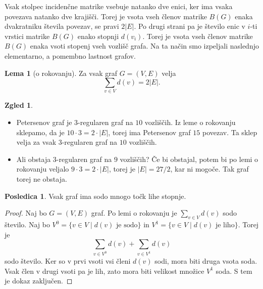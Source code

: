 \documentclass[11pt]{book}
\theoremstyle{definition}
\theoremstyle{zgled}
\newtheorem*{zgled}{Zgled}
\theoremstyle{odprtproblem}
\theoremstyle{domacanaloga}
\newenvironment{dokaz}
    {\color{siva}\begin{proof}}
    {\end{proof}}
\theoremstyle{izrek}
\newtheorem*{lema}{Lema}
\newtheorem*{posledica}{Posledica}
\begin{document}
Vsak stolpec incidenčne matrike vsebuje natanko dve enici, ker ima vsaka povezava natanko dve krajišči. Torej je vsota vseh členov matrike $B(G)$ enaka dvakratniku števila povezav, se pravi $2 |E|$. Po drugi strani pa je število enic v $i$-ti vrstici matrike $B(G)$ enako stopnji $d(v_i)$. Torej je vsota vseh členov matrike $B(G)$ enaka vsoti stopenj vseh vozlišč grafa. Na ta način smo izpeljali naslednjo elementarno, a pomembno lastnost grafov.

\begin{lema}[o rokovanju]
    Za vsak graf $G = (V,E)$ velja
    \[
        \sum_{v \in V} d(v) = 2 |E|.
    \]
\end{lema}

\begin{zgled} \leavevmode
    \begin{itemize}
        \item Petersenov graf je $3$-regularen graf na $10$ vozliščih. Iz leme o rokovanju sklepamo, da je $10 \cdot 3 = 2 \cdot |E|$, torej ima Petersenov graf $15$ povezav. Ta sklep velja za vsak $3$-regularen graf na $10$ vozliščih.
        \item Ali obstaja $3$-regularen graf na $9$ vozliščih? Če bi obstajal, potem bi po lemi o rokovanju veljalo $9 \cdot 3 = 2 \cdot |E|$, torej je $|E| = 27/2$, kar ni mogoče. Tak graf torej ne obstaja.
    \end{itemize}
\end{zgled}

\begin{posledica}
Vsak graf ima sodo mnogo točk lihe stopnje.
\end{posledica}
\begin{dokaz}
Naj bo $G = (V,E)$ graf. Po lemi o rokovanju je $\sum_{v \in V} d(v)$ sodo število. Naj bo $V^0 = \{ v \in V \mid \text{$d(v)$ je sodo} \}$ in $V^1 = \{ v \in V \mid \text{$d(v)$ je liho} \}$. Torej je 
\[
    \sum_{v \in V^0} d(v) + \sum_{v \in V^1} d(v)
\]
sodo število. Ker so v prvi vsoti vsi členi $d(v)$ sodi, mora biti druga vsota soda. Vsak člen v drugi vsoti pa je lih, zato mora biti velikost množice $V^1$ soda. S tem je dokaz zaključen.
\end{dokaz}
\end{document}
